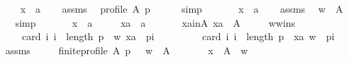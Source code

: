 \begin{isabellebody}
\isanewline
\ \ \isamarkupfalse%
\isanewline
\ \ \ \ x\ {\isacharcolon}{\kern0pt}{\isacharcolon}{\kern0pt}\ {\isachardoublequoteopen}{\isacharprime}{\kern0pt}a{\isachardoublequoteclose}\isanewline
\ \ \isamarkupfalse%
\ assms\ \isamarkupfalse%
\ {\isachardoublequoteopen}profile\ A\ p{\isachardoublequoteclose}\isanewline
\ \ \ \ \isamarkupfalse%
\ simp\isanewline
{}\isamarkupfalse%
\isanewline
\ \ \isamarkupfalse%
\isanewline
\ \ \ \ x\ {\isacharcolon}{\kern0pt}{\isacharcolon}{\kern0pt}\ {\isachardoublequoteopen}{\isacharprime}{\kern0pt}a{\isachardoublequoteclose}\isanewline
\ \ \isamarkupfalse%
\ assms\ \isamarkupfalse%
\ {\isachardoublequoteopen}w\ {\isasymin}\ A{\isachardoublequoteclose}\isanewline
\ \ \ \ \isamarkupfalse%
\ simp\isanewline
{}\isamarkupfalse%
\isanewline
\ \ \isamarkupfalse%
\isanewline
\ \ \ \ x\ {\isacharcolon}{\kern0pt}{\isacharcolon}{\kern0pt}\ {\isachardoublequoteopen}{\isacharprime}{\kern0pt}a{\isachardoublequoteclose}\ \isanewline
\ \ \ \ xa\ {\isacharcolon}{\kern0pt}{\isacharcolon}{\kern0pt}\ {\isachardoublequoteopen}{\isacharprime}{\kern0pt}a{\isachardoublequoteclose}\isanewline
\ \ \isamarkupfalse%
\isanewline
\ \ \ \ xa{\isacharunderscore}{\kern0pt}in{\isacharunderscore}{\kern0pt}A{\isacharcolon}{\kern0pt}\ {\isachardoublequoteopen}xa\ {\isasymin}\ A{\isachardoublequoteclose}\ \isanewline
\ \ \ \ w{\isacharunderscore}{\kern0pt}wins{\isacharcolon}{\kern0pt}\isanewline
\ \ \ \ \ \ {\isachardoublequoteopen}{\isasymnot}\ card\ {\isacharbraceleft}{\kern0pt}i{\isachardot}{\kern0pt}\ i\ {\isacharless}{\kern0pt}\ length\ p\ {\isasymand}\ {\isacharparenleft}{\kern0pt}w{\isacharcomma}{\kern0pt}\ xa{\isacharparenright}{\kern0pt}\ {\isasymin}\ p{\isacharbang}{\kern0pt}i{\isacharbraceright}{\kern0pt}\ {\isacharless}{\kern0pt}\isanewline
\ \ \ \ \ \ \ \ card\ {\isacharbraceleft}{\kern0pt}i{\isachardot}{\kern0pt}\ i\ {\isacharless}{\kern0pt}\ length\ p\ {\isasymand}\ {\isacharparenleft}{\kern0pt}xa{\isacharcomma}{\kern0pt}\ w{\isacharparenright}{\kern0pt}\ {\isasymin}\ p{\isacharbang}{\kern0pt}i{\isacharbraceright}{\kern0pt}{\isachardoublequoteclose}\isanewline
\ \ \isamarkupfalse%
\ assms\ \isamarkupfalse%
\isanewline
\ \ \ \ {\isachardoublequoteopen}finite{\isacharunderscore}{\kern0pt}profile\ A\ p\ {\isasymand}\ \ w\ {\isasymin}\ A\ {\isasymand}\isanewline
\ \ \ \ \ \ {\isacharparenleft}{\kern0pt}{\isasymforall}x\ {\isasymin}\ A\ {\isacharminus}{\kern0pt}\ {\isacharbraceleft}{\kern0pt}w{\isacharbraceright}{\kern0pt}\ {\isachardot}{\kern0pt}\isanewline

\end{isabellebody}
